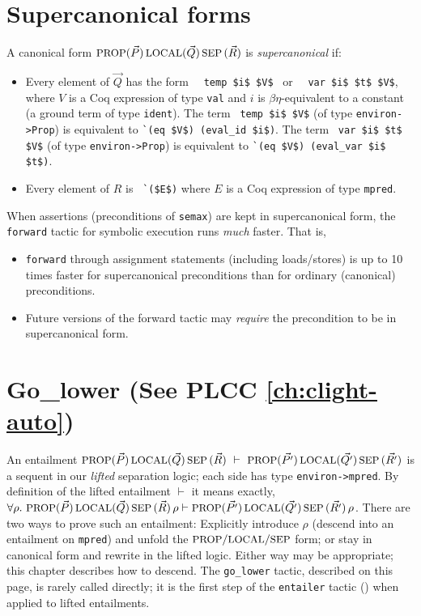 \documentclass[12pt,fleqn,openany,oneside,showtrims]{memoir}
\newcommand{\ychapter}[2]{\chapter[#1]{#1 \hfill \normalsize #2}}
\begin{document}
\ychapter{Supercanonical forms}{}
\label{refcard:supercanonical}

A canonical form \(\mbox{\small PROP} (\vec{P})\,\mbox{\small LOCAL}(\vec{Q})\,\mbox{\small SEP}\,(\vec{R})\)
is \emph{supercanonical} if:
\begin{itemize}
\item Every element of $\vec{Q}$ has the form
~~\lstinline{temp $i$ $V$}~
or ~~\lstinline{var $i$ $t$ $V$},\newline
where $V$ is a Coq expression of type \lstinline{val}
and $i$ is $\beta\eta$-equivalent to 
a constant (a ground term of type \lstinline{ident}).
The term ~\lstinline{temp $i$ $V$}
(of type \lstinline{environ->Prop})
is equivalent to 
\lstinline{`(eq $V$) (eval_id $i$)}.
The term ~\lstinline{var $i$ $t$ $V$}
(of type \lstinline{environ->Prop})
is equivalent to 
\lstinline{`(eq $V$) (eval_var $i$ $t$)}.

\item Every element of $R$ is
~\lstinline{`($E$)} where $E$ is a Coq expression of type \lstinline{mpred}.
\end{itemize}

When assertions (preconditions of \lstinline{semax}) are kept
in supercanonical form, the \lstinline{forward} tactic
for symbolic execution runs \emph{much} faster.  That is,
\begin{itemize}
\item \lstinline{forward} through assignment statements
(including loads/stores) is up to 10 times faster for supercanonical
preconditions than for ordinary (canonical) preconditions.
\item Future versions of the forward tactic may \emph{require}
the precondition to be in supercanonical form.
\end{itemize}

\ychapter{Go\_lower}{(See PLCC \autoref{ch:clight-auto})}
\label{refcard:go-lower}
An entailment 
$\mbox{\small PROP} (\vec{P})\,\mbox{\small LOCAL}(\vec{Q})\,\mbox{\small SEP}\,(\vec{R})~
\vdash ~
\mbox{\small PROP} (\vec{P'})\,\mbox{\small LOCAL}(\vec{Q'})\,\mbox{\small SEP}\,(\vec{R'})
$
is a sequent in our \emph{lifted} separation logic;
each side
has type \lstinline{environ->mpred}.  By definition of the lifted
entailment $\vdash$ it means exactly,\linebreak
$\forall \rho.~
\mbox{\small PROP} (\vec{P})\,\mbox{\small LOCAL}(\vec{Q})\,\mbox{\small SEP}\,(\vec{R})\,\rho
\vdash 
\mbox{\small PROP} (\vec{P'})\,\mbox{\small LOCAL}(\vec{Q'})\,\mbox{\small SEP}\,(\vec{R'})\,\rho
$. \linebreak
There are two ways to prove such an entailment:
Explicitly introduce $\rho$ (descend
into an entailment on \lstinline{mpred}) and 
unfold the $\mbox{\small PROP}/\mbox{\small LOCAL}/\mbox{\small SEP}$ form; 
or stay in canonical form and rewrite in
the lifted logic.
Either way may be appropriate; this chapter describes
how to descend.
The \lstinline{go_lower} tactic, described on this page,
is rarely called directly; it is the first step of the
\lstinline{entailer} tactic ()
when applied to lifted entailments.
\end{document}
